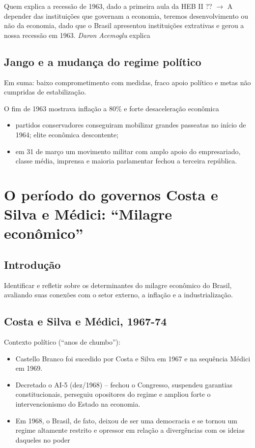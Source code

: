 \documentclass[a4paper,12pt]{article}[abntex2]
\begin{document}
Quem explica a recessão de 1963, dado a primeira aula da HEB II ?? $\rightarrow$ A depender das instituições que governam a economia, teremos desenvolvimento ou não da economia, dado que o Brasil apresentou instituições extrativas e gerou a nossa recessão em 1963. \textit{Daron Acemoglu} explica

\subsection{\textbf{Jango e a mudança do regime político}}

Em suma: baixo comprometimento com medidas, fraco apoio político e metas não cumpridas de estabilização.

O fim de 1963 mostrava inflação a 80\% e forte desaceleração econômica\begin{itemize}
    \item partidos conservadores conseguiram mobilizar grandes passeatas no início de 1964; elite econômica descontente;
    \item em 31 de março um movimento militar com amplo apoio do empresariado, classe média, imprensa e maioria parlamentar fechou a terceira república.
\end{itemize}
\newpage

\section{\textbf{O período do governos Costa e Silva e Médici: “Milagre econômico”}}
\subsection{\textbf{Introdução}}
Identificar e refletir sobre os determinantes do milagre econômico do Brasil, avaliando suas conexões com o setor externo, a inflação e a industrialização.

\subsection{\textbf{Costa e Silva e Médici, 1967-74}}
Contexto político (“anos de chumbo”):\begin{itemize}
    \item Castello Branco foi sucedido por Costa e Silva em 1967 e na sequência Médici em 1969.
    \item Decretado o AI-5 (dez/1968) – fechou o Congresso, suspendeu garantias constitucionais, perseguiu opositores do regime e ampliou forte o intervencionismo do Estado na economia.
    \item Em 1968, o Brasil, de fato, deixou de ser uma democracia e se tornou um regime altamente restrito e opressor em relação a divergências com os ideias daqueles no poder
\end{itemize}
\end{document}
